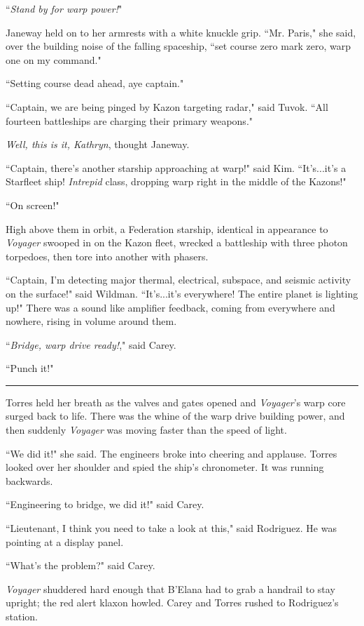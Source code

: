 \documentclass[twoside,letterpaper,12pt]{memoir}
\begin{document}
``\textit{Stand by for warp power!}"

Janeway held on to her armrests with a white knuckle grip. ``Mr. Paris," she said, over the building noise of the falling spaceship, ``set course zero mark zero, warp one on my command."

``Setting course dead ahead, aye captain."

``Captain, we are being pinged by Kazon targeting radar," said Tuvok. ``All fourteen battleships are charging their primary weapons."

\textit{Well, this is it, Kathryn}, thought Janeway.

``Captain, there's another starship approaching at warp!" said Kim. ``It's...it's a Starfleet ship! \textit{Intrepid} class, dropping warp right in the middle of the Kazons!"

``On screen!"

High above them in orbit, a Federation starship, identical in appearance to \textit{Voyager} swooped in on the Kazon fleet, wrecked a battleship with three photon torpedoes, then tore into another with phasers.

``Captain, I'm detecting major thermal, electrical, subspace, and seismic activity on the surface!" said Wildman. ``It's...it's everywhere! The entire planet is lighting up!" There was a sound like amplifier feedback, coming from everywhere and nowhere, rising in volume around them.

``\textit{Bridge, warp drive ready!}," said Carey.

``Punch it!"

\fancybreak{\rule{3cm}{0.4 pt}}
Torres held her breath as the valves and gates opened and \textit{Voyager}'s warp core surged back to life. There was the whine of the warp drive building power, and then suddenly \textit{Voyager} was moving faster than the speed of light.

``We did it!" she said. The engineers broke into cheering and applause. Torres looked over her shoulder and spied the ship's chronometer. It was running backwards.

``Engineering to bridge, we did it!" said Carey.

``Lieutenant, I think you need to take a look at this," said Rodriguez. He was pointing at a display panel.

``What's the problem?" said Carey.

\textit{Voyager} shuddered hard enough that B'Elana had to grab a handrail to stay upright; the red alert klaxon howled. Carey and Torres rushed to Rodriguez's station.
\end{document}
